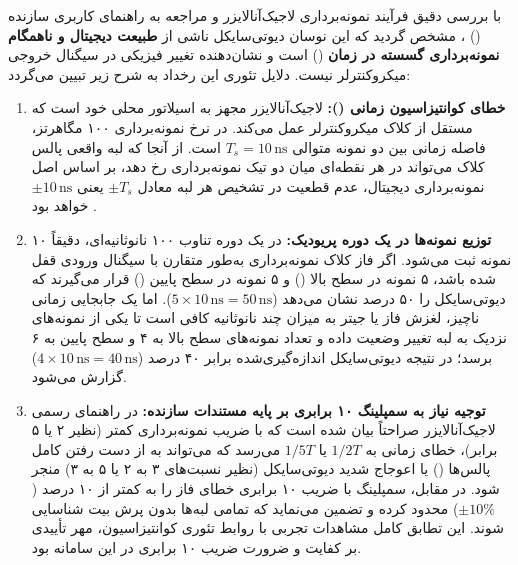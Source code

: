 با بررسی دقیق فرآیند نمونه‌برداری لاجیک‌آنالایزر و مراجعه به راهنمای کاربری سازنده () \cite{dslab2023dsview}، مشخص گردید که این نوسان دیوتی‌سایکل ناشی از \textbf{طبیعت دیجیتال و ناهمگام نمونه‌برداری گسسته در زمان} () است و نشان‌دهنده تغییر فیزیکی در سیگنال خروجی میکروکنترلر نیست. دلایل تئوری این رخداد به شرح زیر تبیین می‌گردد:
\begin{enumerate}
    \item \textbf{خطای کوانتیزاسیون زمانی ():} لاجیک‌آنالایزر مجهز به اسیلاتور محلی خود است که مستقل از کلاک میکروکنترلر عمل می‌کند. در نرخ نمونه‌برداری ۱۰۰ مگاهرتز، فاصله زمانی بین دو نمونه متوالی $T_s = 10\,\mathrm{ns}$ است. از آنجا که لبه واقعی پالس کلاک می‌تواند در هر نقطه‌ای میان دو تیک نمونه‌برداری رخ دهد، بر اساس اصل نمونه‌برداری دیجیتال، عدم قطعیت در تشخیص هر لبه معادل $\pm T_s$ یعنی $\pm 10\,\mathrm{ns}$ خواهد بود \cite{dslab2023dsview}.
    \item \textbf{توزیع نمونه‌ها در یک دوره پریودیک:} در یک دوره تناوب ۱۰۰ نانوثانیه‌ای، دقیقاً ۱۰ نمونه ثبت می‌شود. اگر فاز کلاک نمونه‌برداری به‌طور متقارن با سیگنال ورودی قفل شده باشد، ۵ نمونه در سطح بالا () و ۵ نمونه در سطح پایین () قرار می‌گیرند که دیوتی‌سایکل را ۵۰ درصد نشان می‌دهد ($5 \times 10\,\mathrm{ns} = 50\,\mathrm{ns}$). اما یک جابجایی زمانی ناچیز، لغزش فاز یا جیتر به میزان چند نانوثانیه کافی است تا یکی از نمونه‌های نزدیک به لبه تغییر وضعیت داده و تعداد نمونه‌های سطح بالا به ۴ و سطح پایین به ۶ برسد؛ در نتیجه دیوتی‌سایکل اندازه‌گیری‌شده برابر ۴۰ درصد ($4 \times 10\,\mathrm{ns} = 40\,\mathrm{ns}$) گزارش می‌شود.
    \item \textbf{توجیه نیاز به سمپلینگ ۱۰ برابری بر پایه مستندات سازنده:} در راهنمای رسمی لاجیک‌آنالایزر \cite[بخش ۲.۳.۲ و شکل ۲-۱۰]{dslab2023dsview} صراحتاً بیان شده است که با ضریب نمونه‌برداری کمتر (نظیر ۲ یا ۵ برابر)، خطای زمانی به $1/2 T$ یا $1/5 T$ می‌رسد که می‌تواند به از دست رفتن کامل پالس‌ها () یا اعوجاج شدید دیوتی‌سایکل (نظیر نسبت‌های ۳ به ۲ یا ۵ به ۳) منجر شود. در مقابل، سمپلینگ با ضریب ۱۰ برابری خطای فاز را به کمتر از ۱۰ درصد ($\pm 10\%$) محدود کرده و تضمین می‌نماید که تمامی لبه‌ها بدون پرش بیت شناسایی شوند. این تطابق کامل مشاهدات تجربی با روابط تئوری کوانتیزاسیون، مهر تأییدی بر کفایت و ضرورت ضریب ۱۰ برابری در این سامانه بود.
\end{enumerate}

